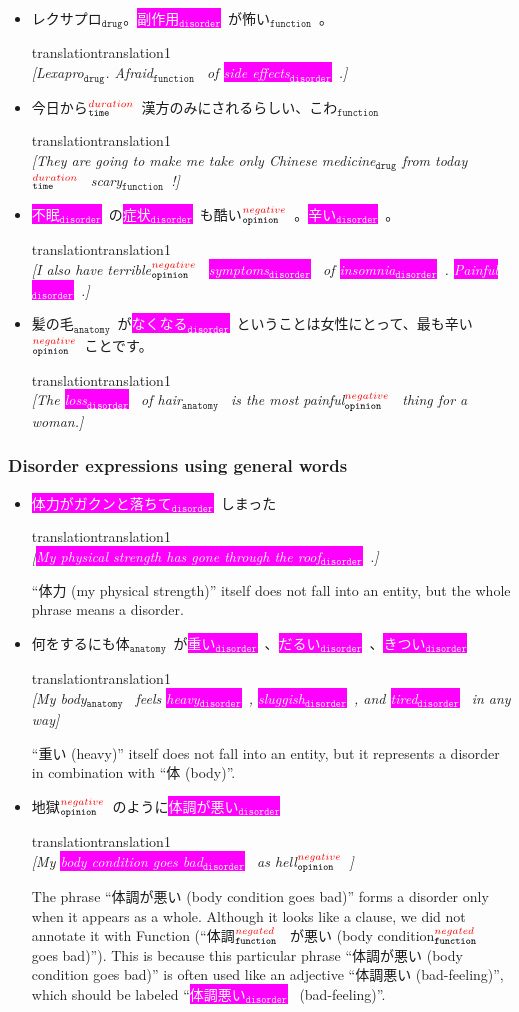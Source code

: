 \documentclass[12pt]{article}
\theoremstyle{definition}
\newcommand{\drug}[1]{\colorbox{brass}{#1$_{\texttt{drug}}$}}
\newcommand{\anatomy}[1]{\colorbox{dollarbill}{#1$_{\texttt{anatomy}}$}\ }
\newcommand{\disorder}[1]{\colorbox{fuchsia}{\textcolor{white}{#1$_{\texttt{disorder}}$}}\ }
\newcommand{\function}[1]{\colorbox{banana}{#1$_{\texttt{function}}$}\ }
\newcommand{\functionNeg}[1]{\colorbox{banana}{#1$_{\texttt{function}}^{\textcolor{red}{negated}}$}\ }
\newcommand{\opNeg}[1]{\colorbox{babyblue}{#1$_{\texttt{opinion}}^{\textcolor{red}{negative}}$}\ }
\newcommand{\timexDur}[2]{\colorbox{ashgrey}{#1$_{\texttt{time}}^{\textcolor{red}{duration}}$}\ }
\newcommand{\translation}[1]{\begin{ocg}{translation}{translation}{1}\footnotesize{\\\textit{[#1]}}\end{ocg}}
\begin{document}
\begin{itemize}
    \item \drug{レクサプロ}。\disorder{副作用}が\function{怖い}。
        \translation{\drug{Lexapro}. \function{Afraid} of \disorder{side effects}.}

    \item \timexDur{今日から}\drug{漢方}のみにされるらしい、\function{こわ}  %
        \translation{They are going to make me take only \drug{Chinese medicine} \timexDur{from today}, \function{scary}!}

    \item \disorder{不眠}の\disorder{症状}も\opNeg{酷い}。\disorder{辛い}。
        \translation{I also have \opNeg{terrible} \disorder{symptoms} of \disorder{insomnia}. \disorder{Painful}.}

    \item \anatomy{髪の毛}が\disorder{なくなる}ということは女性にとって、\opNeg{最も辛い}ことです。
        \translation{The \disorder{loss} of \anatomy{hair} is the \opNeg{most painful} thing for a woman.}

\end{itemize}

\subsubsection{Disorder expressions using general words}

\begin{itemize}
    \item \disorder{体力がガクンと落ちて}しまった
        \translation{\disorder{My physical strength has gone through the roof}.}

        ``体力 (my physical strength)'' itself does not fall into an entity, but the whole phrase means a disorder.

    \item 何をするにも\anatomy{体}が\disorder{重い}、\disorder{だるい}、\disorder{きつい}
        \translation{My \anatomy{body} feels \disorder{heavy}, \disorder{sluggish}, and \disorder{tired} in any way}

        ``重い (heavy)'' itself does not fall into an entity, but it represents a disorder in combination with ``体 (body)''.

    \item \opNeg{地獄}のように\disorder{体調が悪い}
        \translation{My \disorder{body condition goes bad} as \opNeg{hell}}

        The phrase ``体調が悪い (body condition goes bad)'' forms a disorder only when it appears as a whole.
        Although it looks like a clause, we did not annotate it with Function (``\functionNeg{体調} が悪い (\functionNeg{body condition} goes bad)'').
        This is because this particular phrase ``体調が悪い (body condition goes bad)'' is often used like an adjective ``体調悪い (bad-feeling)'', which should be labeled ``\disorder{体調悪い} (bad-feeling)''.

\end{itemize}
\end{document}
